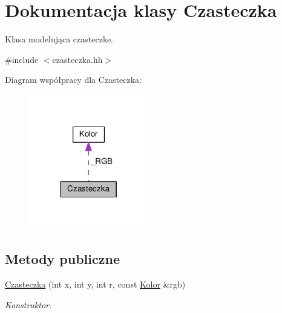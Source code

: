 \hypertarget{class_czasteczka}{}\section{Dokumentacja klasy Czasteczka}
\label{class_czasteczka}


Klasa modelująca czasteczke.  




{\ttfamily \#include $<$czasteczka.\+hh$>$}



Diagram współpracy dla Czasteczka\+:\nopagebreak
\begin{figure}[H]
\begin{center}
\leavevmode
\includegraphics[width=148pt]{class_czasteczka__coll__graph}
\end{center}
\end{figure}
\subsection*{Metody publiczne}
\begin{DoxyCompactItemize}
\item 
\hyperlink{class_czasteczka_a8e8196c934b65fa6a5b37941354ab68d}{Czasteczka} (int x, int y, int r, const \hyperlink{class_kolor}{Kolor} \&rgb)
\begin{DoxyCompactList}\small\item\em Konstruktor. \end{DoxyCompactList}\end{DoxyCompactItemize}
